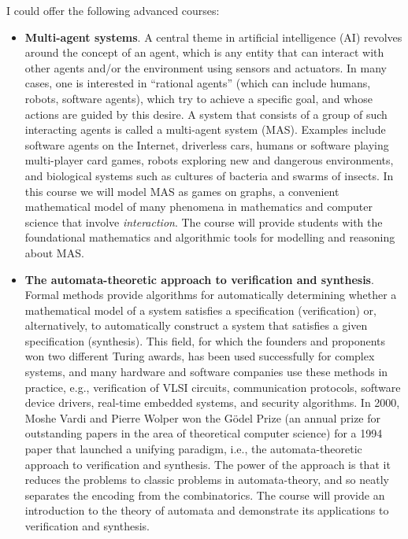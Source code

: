 \documentclass[10,a4paper,sans]{moderncv}
\begin{document}
I could offer the following advanced courses: 
\begin{itemize}
\item \textbf{Multi-agent systems}. A central theme in artificial intelligence (AI) revolves around the concept of an agent,
which is any entity that can interact with other agents and/or the environment using sensors 
and actuators. In many cases, one is interested in ``rational agents'' (which can
include humans, robots, software agents), which try to achieve a specific goal, and whose
actions are guided by this desire. A system that consists of a group of such interacting
agents is called a multi-agent system (MAS). Examples include software agents on
the Internet, driverless cars, humans or software playing multi-player card games, robots
exploring new and dangerous environments, and biological systems such as cultures of
bacteria and swarms of insects. In this course we will model MAS as games on graphs, 
a convenient mathematical model of many phenomena in mathematics and computer science that involve \emph{interaction}.
The course will provide students with the foundational mathematics and algorithmic tools for modelling and reasoning 
about MAS. 


\item \textbf{The automata-theoretic approach to verification and synthesis}.  Formal methods provide algorithms 
for automatically determining whether a mathematical model of a system satisfies a specification (verification)
or, alternatively, to automatically construct a system that satisfies a given specification (synthesis). 
This field, for which the founders and proponents won two different Turing awards, has been used successfully for
complex systems, and many hardware and software companies use these methods in practice, 
e.g., verification of VLSI circuits, communication protocols, software device drivers, real-time embedded systems, and security algorithms.
In 2000, Moshe Vardi and Pierre Wolper won the G\"odel Prize (an annual prize for outstanding papers in the area of theoretical computer science) for 
a 1994 paper that launched a unifying paradigm, i.e., the automata-theoretic approach to verification and synthesis. 
The power of the approach is that it reduces the problems to classic problems in automata-theory, and so neatly separates the encoding from the combinatorics. 
The course will provide an introduction to the theory of automata and demonstrate its applications to verification and synthesis. 

\end{itemize}
\end{document}
